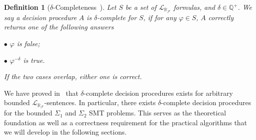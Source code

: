 \documentclass[12pt]{article}
\newtheorem{definition}[theorem]{Definition}
\newcommand{\lrf}{\mathcal{L}_{\mathbb{R}_{\mathcal{F}}}}
\begin{document}
\begin{definition}[$\delta$-Completeness~\cite{DBLP:conf/cade/GaoAC12}]
Let $S$ be a set of $\lrf$ formulas, and $\delta\in \mathbb{Q}^+$. We say a decision procedure $A$ is $\delta$-complete for $S$, if for any $\varphi\in S$, $A$ correctly returns one of the following answers

$\bullet$ $\varphi$ is false;

$\bullet$ $\varphi^{-\delta}$ is true.

If the two cases overlap, either one is correct.
\end{definition}
We have proved in~\cite{DBLP:conf/lics/GaoAC12} that $\delta$-complete decision procedures exists for arbitrary bounded $\lrf$-sentences. In particular, there exists $\delta$-complete decision procedures for the bounded $\Sigma_1$ and $\Sigma_2$ SMT problems. This serves as the theoretical foundation as well as a correctness requirement for the practical algorithms that we will develop in the following sections.
\end{document}
